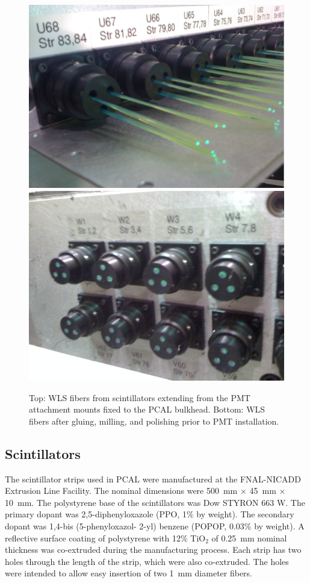 \begin{figure}[hbt]
\centering
\includegraphics[width=0.9\columnwidth,keepaspectratio]{img/S3_5a.png}
\includegraphics[width=0.9\columnwidth,keepaspectratio]{img/S3_5b.png}
\caption[PCAL UVW Layers]{Top: WLS fibers from scintillators extending from the PMT attachment mounts
  fixed to the PCAL bulkhead. Bottom: WLS fibers after gluing, milling, and polishing prior to PMT installation.}
\label{fig:S3_5}
\end{figure}

\subsection{Scintillators}

The scintillator strips used in PCAL were manufactured at the FNAL-NICADD Extrusion Line Facility. The
nominal dimensions were 500~mm $\times$ 45~mm $\times$ 10~mm. The polystyrene base of the scintillators
was Dow STYRON 663 W. The primary dopant was 2,5-diphenyloxazole (PPO, 1$\%$ by weight). The secondary
dopant was 1,4-bis (5-phenyloxazol- 2-yl) benzene (POPOP, 0.03$\%$ by weight). A reflective surface coating
of polystyrene with 12$\%$ TiO$_2$ of 0.25~mm nominal thickness was co-extruded during the manufacturing
process. Each strip has two holes through the length of the strip, which were also co-extruded. The holes were
intended to allow easy insertion of two 1~mm diameter fibers.

